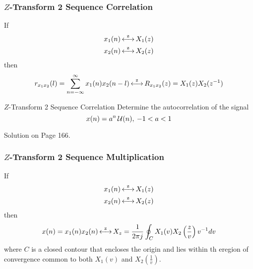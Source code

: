\subsubsection{\texorpdfstring{$Z$-Transform}{Z-Transform} 2 Sequence Correlation}\label{subsubsec:Z-Transform 2 Sequence Correlation}
If
\begin{equation*}
  \begin{aligned}
    x_{1}(n) &\operatorname{\overset{z}{\longleftrightarrow}} X_{1}(z) \\
    x_{2}(n) &\operatorname{\overset{z}{\longleftrightarrow}} X_{2}(z) \\
  \end{aligned}
\end{equation*}
then
\begin{equation}\label{eq:Z-Transform 2 Sequence Correlation}
  r_{x_{1}x_{2}}(l) = \sum\limits_{n=-\infty}^{\infty} x_{1}(n)x_{2}(n-l) \operatorname{\overset{z}{\longleftrightarrow}} R_{x_{1}x_{2}}(z) = X_{1}(z)X_{2}(z^{-1})
\end{equation}

\begin{example}[Example 3.2.10]{\texorpdfstring{$Z$-Transform}{Z-Transform} 2 Sequence Correlation}
  Determine the autocorrelation of the signal
  \begin{equation*}
    x(n) = a^{n}\operatorname{\mathcal{U}}(n), \> -1<a<1
  \end{equation*}

  \tcblower

  Solution on Page 166.
\end{example}

\subsubsection{\texorpdfstring{$Z$-Transform}{Z-Transform} 2 Sequence Multiplication}\label{subsubsec:Z-Transform 2 Sequence Multiplication}
If
\begin{equation*}
  \begin{aligned}
    x_{1}(n) &\operatorname{\overset{z}{\longleftrightarrow}} X_{1}(z) \\
    x_{2}(n) &\operatorname{\overset{z}{\longleftrightarrow}} X_{2}(z) \\
  \end{aligned}
\end{equation*}
then
\begin{equation}\label{eq:Z-Transform 2 Sequence Multiplication}
  x(n) = x_{1}(n)x_{2}(n) \operatorname{\overset{z}{\longleftrightarrow}} X_{z} = \frac{1}{2 \pi j} \oint_{C} X_{1}(v)X_{2}\left( \frac{z}{v} \right) v^{-1} dv
\end{equation}
where $C$ is a closed contour that encloses the origin and lies within th eregion of convergence common to both $X_{1}(v)$ and $X_{2}(\frac{1}{v})$.

